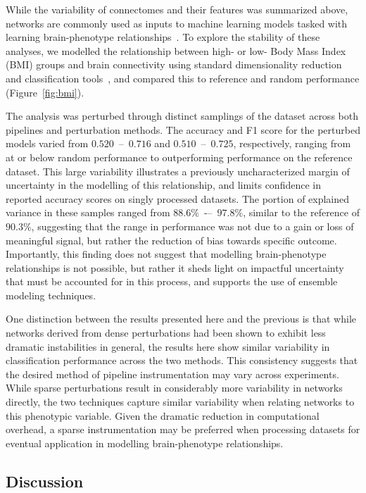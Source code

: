 \documentclass[fleqn,10pt]{SelfArx} %
\newcommand{\new}[1]{{\color{blue} #1}}
\begin{document}
While the variability of connectomes and their features was summarized above, networks are commonly used as inputs to
machine learning models tasked with learning brain-phenotype relationships~\cite{Dubois2016-yr}. To explore the
stability of these analyses, we modelled the relationship between high- or low- Body Mass Index (BMI) groups and brain
connectivity using standard dimensionality reduction and classification tools~\cite{Park2015-uj,Gupta2015-ap}, and
compared this to reference and random performance (Figure~\ref{fig:bmi}).

The analysis was perturbed through distinct samplings of the dataset across both pipelines and perturbation methods.
The accuracy and F1 score for the perturbed models varied from $0.520$~–~$0.716$ and $0.510$~–~$0.725$, respectively,
ranging from at or below random performance to outperforming performance on the reference dataset. This large
variability illustrates a previously uncharacterized margin of uncertainty in the modelling of this relationship, and
limits confidence in reported accuracy scores on singly processed datasets. The portion of explained variance in these
samples ranged from $88.6\%$~-–~$97.8\%$, similar to the reference \new{of $90.3\%$}, suggesting that the range in
performance was not due to a gain or loss of meaningful signal, but rather the reduction of bias towards specific
outcome. Importantly, this finding does not suggest that modelling brain-phenotype relationships is not possible, but
rather it sheds light on impactful uncertainty that must be accounted for in this process, and supports the use of
ensemble modeling techniques.

\new{One distinction between the results presented here and the previous is that while networks derived from dense
perturbations had been shown to exhibit less dramatic instabilities in general, the results here show similar
variability in classification performance across the two methods. This consistency suggests that the desired method of
pipeline instrumentation may vary across experiments. While sparse perturbations result in considerably more
variability in networks directly, the two techniques capture similar variability when relating networks to this
phenotypic variable. Given the dramatic reduction in computational overhead, a sparse instrumentation may be preferred
when processing datasets for eventual application in modelling brain-phenotype relationships.}

\subsection*{Discussion}
\end{document}
